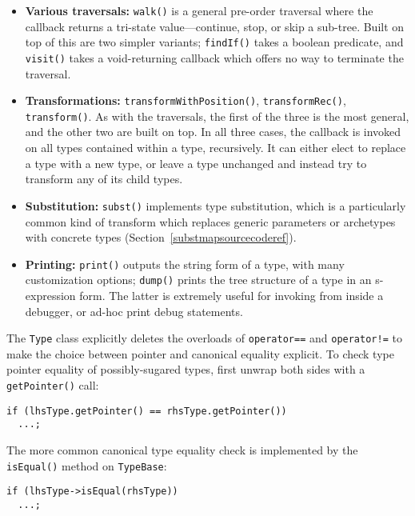 \documentclass[../generics]{subfiles}
\begin{document}
\begin{itemize}
\item \textbf{Various traversals:} \texttt{walk()} is a general pre-order traversal where the callback returns a tri-state value---continue, stop, or skip a sub-tree. Built on top of this are two simpler variants; \texttt{findIf()} takes a boolean predicate, and \texttt{visit()} takes a void-returning callback which offers no way to terminate the traversal.
\item \textbf{Transformations:} \texttt{transformWithPosition()}, \texttt{transformRec()}, \texttt{transform()}. As with the traversals, the first of the three is the most general, and the other two are built on top. In all three cases, the callback is invoked on all types contained within a type, recursively. It can either elect to replace a type with a new type, or leave a type unchanged and instead try to transform any of its child types.
\item \textbf{Substitution:} \texttt{subst()} implements type substitution, which is a particularly common kind of transform which replaces generic parameters or archetypes with concrete types (Section~\ref{substmapsourcecoderef}).
\item \textbf{Printing:} \texttt{print()} outputs the string form of a type, with many customization options; \texttt{dump()} prints the tree structure of a type in an s-expression form. The latter is extremely useful for invoking from inside a debugger, or ad-hoc print debug statements.
\end{itemize}
The \texttt{Type} class explicitly deletes the overloads of \texttt{operator==} and \texttt{operator!=} to make the choice between pointer and canonical equality explicit. To check type pointer equality of possibly-sugared types, first unwrap both sides with a \texttt{getPointer()} call:
\begin{Verbatim}
if (lhsType.getPointer() == rhsType.getPointer())
  ...;
\end{Verbatim}
The more common canonical type equality check is implemented by the \texttt{isEqual()} method on \texttt{TypeBase}:
\begin{Verbatim}
if (lhsType->isEqual(rhsType))
  ...;
\end{Verbatim}
\end{document}
